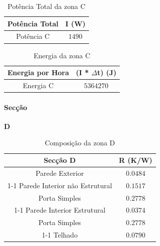 \documentclass[12pt, a4paper]{article}
\begin{document}
\vspace{35mm}

\begin{table}[htpb]
	\begin{center}
		\begin{tabular}{c c}
			\toprule
			Potência  Total 										 & 	I (W) \\
			\midrule
			 Potência C		               	     & $1490$	 \\
			\bottomrule
		\end{tabular}
	\end{center}
	\caption{Potência Total da zona C}\label{tab:8seccaoCpotT}
\end{table}

\vspace{35mm}

\begin{table}[htpb]
	\begin{center}
		\begin{tabular}{c c}
			\toprule
			Energia por Hora 								 & 	(I * $\Delta$t) (J) \\
			\midrule
			Energia C 						               	     & $5364270$	 \\
			\bottomrule
		\end{tabular}
	\end{center}
	\caption{Energia da zona C}\label{tab:7seccaoCpotT}
\end{table}

\pagebreak
\paragraph{Secção}
\textbf{D}

\begin{table}[htpb]
	\begin{center}
		\begin{tabular}{c c}
			\toprule
			Secção D  													 & 	R (K/W) \\
			\midrule
			Parede Exterior              		        		     & $0.0484$		 \\
			\cline{1-1}
			\multirow{2}{*}{2x  }
			Parede Interior n\~ao Estrutural               & $0.1517$		 \\
			Porta Simples                 						     & $0.2778$		 \\
			\cline{1-1}
			Parede Interior Estrutural             	   		 & $0.0374$		 \\
			Porta Simples                 							 & $0.2778$		 \\
			\cline{1-1}
			Telhado                   									 & $0.0790$		 \\
			\bottomrule
		\end{tabular}
	\end{center}
	\caption{Composição da zona D}\label{tab:seccaoD}
\end{table}
\end{document}
